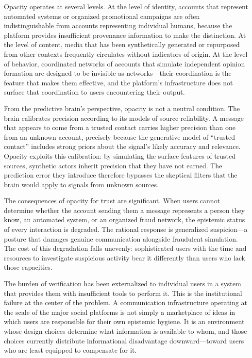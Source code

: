 \documentclass[12pt,a4paper]{article}
\begin{document}
Opacity operates at several levels. At the level of identity, accounts that represent automated
systems or organized promotional campaigns are often indistinguishable from accounts representing
individual humans, because the platform provides insufficient provenance information to make the
distinction. At the level of content, media that has been synthetically generated or repurposed
from other contexts frequently circulates without indicators of origin. At the level of behavior,
coordinated networks of accounts that simulate independent opinion formation are designed to be
invisible as networks---their coordination is the feature that makes them effective, and the
platform's infrastructure does not surface that coordination to users encountering their output.

From the predictive brain's perspective, opacity is not a neutral condition. The brain
calibrates precision according to its models of source reliability. A message that appears to
come from a trusted contact carries higher precision than one from an unknown account, precisely
because the generative model of ``trusted contact'' includes strong priors about the signal's
likely accuracy and relevance. Opacity exploits this calibration: by simulating the surface
features of trusted sources, synthetic actors inherit precision that they have not earned. The
prediction error they introduce therefore bypasses the skeptical filters that the brain would
apply to signals from unknown sources.

The consequences of opacity for trust are significant. When users cannot determine whether the
account sending them a message represents a person they know, an automated system, or an
organized fraud network, the epistemic status of every interaction is degraded. The rational
response is generalized suspicion---a posture that damages genuine communication alongside
fraudulent simulation. The cost of this degradation falls unevenly: sophisticated users with the
time and resources to investigate suspicious activity bear it differently than users who lack
those capacities.

The burden of verification has been externalized to individual users in a system that provides
them with insufficient tools to perform it. This is the institutional failure at the center of
the problem. A communication infrastructure operating at the scale of the major social platforms
is not simply a marketplace of ideas in which users are responsible for their own epistemic
hygiene. It is an environment whose design choices determine what information is available to
whom, and those choices currently distribute informational disadvantage downward---toward users
who are least equipped to compensate for it.
\end{document}
